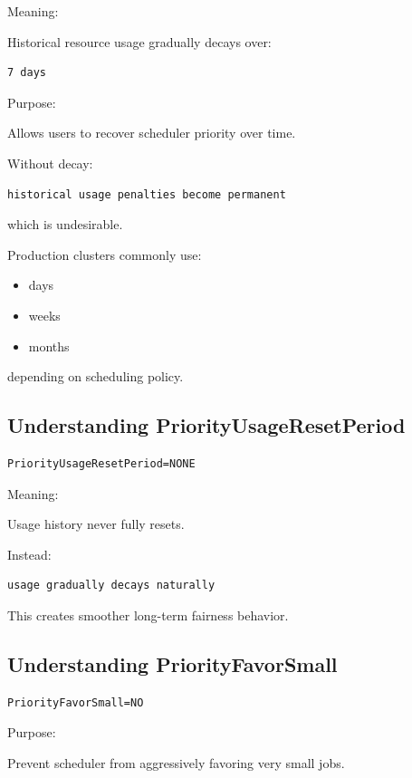 \documentclass[11pt]{article}
\begin{document}
Meaning:

Historical resource usage gradually decays over:

\begin{verbatim}
7 days
\end{verbatim}

Purpose:

Allows users to recover scheduler priority over time.

Without decay:

\begin{verbatim}
historical usage penalties become permanent
\end{verbatim}

which is undesirable.

Production clusters commonly use:

\begin{itemize}
\item days
\item weeks
\item months
\end{itemize}

depending on scheduling policy.
\subsection{Understanding PriorityUsageResetPeriod}
\label{sec:orgd283b65}

\begin{verbatim}
PriorityUsageResetPeriod=NONE
\end{verbatim}

Meaning:

Usage history never fully resets.

Instead:

\begin{verbatim}
usage gradually decays naturally
\end{verbatim}

This creates smoother long-term fairness behavior.
\subsection{Understanding PriorityFavorSmall}
\label{sec:org883c831}

\begin{verbatim}
PriorityFavorSmall=NO
\end{verbatim}

Purpose:

Prevent scheduler from aggressively favoring very small jobs.
\end{document}
